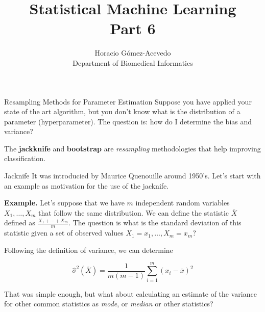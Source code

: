 \documentclass{beamer}
\title{Statistical Machine Learning\\ Part 6}
\author{Horacio G\'omez-Acevedo\\ Department of Biomedical Informatics}
\begin{document}
	\begin{frame}[plain]
		\maketitle
	\end{frame}


\begin{frame}{Resampling Methods for Parameter Estimation}
	Suppose you have applied your state of the art algorithm, but you don't know what is the distribution of a parameter (hyperparameter). The question is: how do I determine the bias and variance?
	
	The {\bf jackknife} and {\bf bootstrap} are {\it resampling} methodologies that help improving classification.
	
	
	 
\end{frame}

\begin{frame}{Jacknife}
	It was introducied by Maurice Quenouille around 1950's.  Let's start with an example as motivation for the use of the jacknife. 
	
	{\bf Example. } Let's suppose that we have 
	$m$ independent random variables $X_1,\ldots, X_m$ that follow the same distribution. We can define the statistic $\overline{X}$ defined as $\frac{X_1 + \cdots + X_m}{m}$. The question is what is the standard deviation of this statistic given a set of observed values $X_1=x_1,\ldots, X_m=x_m$?
	
	Following the definition of variance, we can determine
	
	\begin{equation}
		\widehat{\sigma}^2(\overline{X})= \frac{1}{m(m-1)} \sum_{i=1}^m (x_i - \overline{x})^2
		\label{eq:stdev}
	\end{equation}
	
	That was simple enough, but what about calculating an estimate of the variance for other common statistics as  {\it mode}, or {\it median} or other statistics?
	
\end{frame}
\end{document}
